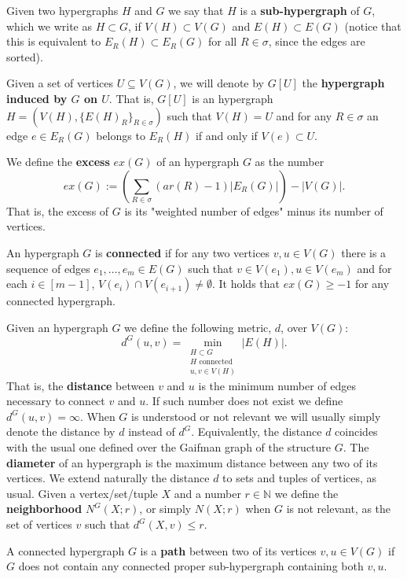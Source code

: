 \documentclass[12pt,notitlepage,a4paper]{article}
\theoremstyle{definition}
\newcommand{\N}{\mathbb{N}}
\begin{document}
Given two hypergraphs $H$ and $G$ we say that $H$
is a \textbf{sub-hypergraph} of $G$, which we write as $H\subset G$,
if $V(H)\subset V(G)$ and $E(H)\subset E(G)$ (notice 
that this is equivalent to $E_R(H)\subset E_R(G)$ for all
$R\in \sigma$, since the edges are sorted).\par


Given a set of vertices $U\subseteq V(G)$, 
we will denote by $G[U]$ the \textbf{hypergraph induced
by $G$ on $U$}. That is, $G[U]$ is an hypergraph
$H=(V(H),\{E(H)_R\}_{R\in \sigma})$ such that 
$V(H)=U$ and for any $R\in \sigma$ 
an edge $e\in E_R(G)$ belongs 
to $E_R(H)$ if and only if $V(e)\subset U$.
\par



We define the \textbf{excess} $ex(G)$ of an hypergraph $G$ as the number
\[
ex(G):= \left(\sum_{R\in \sigma} (ar(R)-1)|E_R(G)|\right) - |V(G)|.  
\] 
That is, the excess of $G$ is its "weighted number of edges"
minus its number of vertices. \par
An hypergraph $G$ is \textbf{connected} if for any two vertices $v,u\in V(G)$
there is a sequence of edges $e_1,\dots, e_m\in E(G)$ such that
$v\in V(e_1), u\in V(e_m)$ and for each $i\in [m-1]$, 
$V(e_i)\cap V(e_{i+1})\neq \emptyset$. It holds that
$ex(G)\geq -1$ for any connected hypergraph.
\par
Given an hypergraph $G$ we define the following metric, $d$, over $V(G)$:
\[ d^G(u,v)= \min_{\substack{H \subset G\\ 
		H \text{ connected }\\
		u,v\in V(H)}} |E(H)| .\]
That is, the \textbf{distance} between $v$ and $u$ is the minimum number of
edges necessary to connect $v$ and $u$. 
If such number does not exist we define $d^G(u,v)=\infty$. 
When $G$ 
is understood or not relevant we will usually simply denote the 
distance by $d$ instead of $d^G$. Equivalently, the distance $d$
coincides with the usual one defined over the Gaifman graph of the structure 
$G$. The \textbf{diameter} of an hypergraph is the maximum distance between any 
two of its vertices. 
We extend naturally the distance $d$ to sets and tuples of
vertices, as usual. Given a vertex/set/tuple $X$ and a number
$r\in \N$ we define the \textbf{neighborhood}
$N^G(X;r)$, or simply $N(X;r)$ when $G$ is not relevant,
as the set of vertices $v$ such that $d^G(X,v)\leq r$.
\par
A connected hypergraph $G$ is a \textbf{path} between two of its 
vertices $v,u\in V(G)$ if $G$ 
does not contain any connected proper sub-hypergraph containing both $v,u$.
\end{document}
